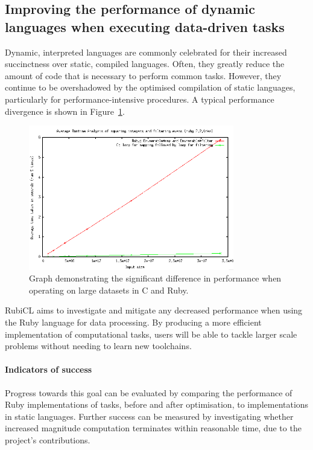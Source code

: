 \subsection{Improving the performance of dynamic languages when executing data-driven tasks}
Dynamic, interpreted languages are commonly celebrated for their increased succinctness over static, compiled languages. Often, they greatly reduce the amount of code that is necessary to perform common tasks. However, they continue to be overshadowed by the optimised compilation of static languages, particularly for performance-intensive procedures. A typical performance divergence is shown in Figure~\ref{fig:ruby_vs_c}.

\begin{figure}[h]
  \includegraphics[width=0.8\textwidth]{./figures/ruby_vs_c.png}
  \caption{Graph demonstrating the significant difference in performance when operating on large datasets in C and Ruby.}
  \label{fig:ruby_vs_c}
\end{figure}


RubiCL aims to investigate and mitigate any decreased performance when using the Ruby language for data processing. By producing a more efficient implementation of computational tasks, users will be able to tackle larger scale problems without needing to learn new toolchains.

\paragraph*{Indicators of success}
Progress towards this goal can be evaluated by comparing the performance of Ruby implementations of tasks, before and after optimisation, to implementations in static languages. Further success can be measured by investigating whether increased magnitude computation terminates within reasonable time, due to the project's contributions.

